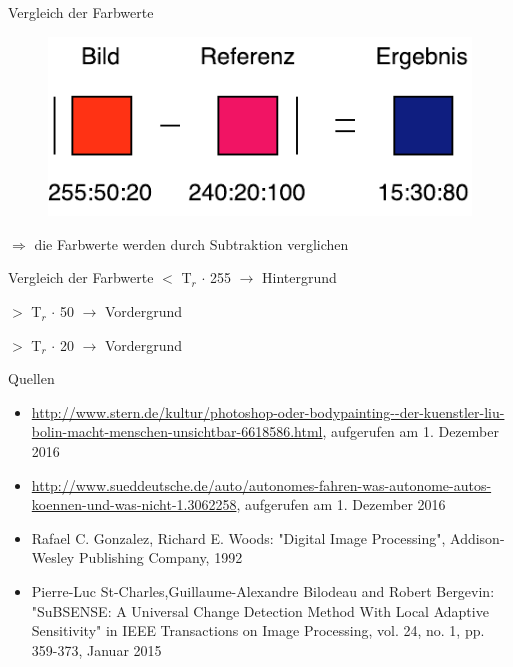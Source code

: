 \documentclass[hyperref={pdfpagelabels=false}]{beamer}
\begin{document}
\begin{frame}[t]{Vergleich der Farbwerte}
	\bigskip
	\bigskip
	\bigskip

	\begin{figure}
		\centering
		\includegraphics[width=0.6\linewidth]{Abbildungen/Farb_Vergleich.pdf}
		\label{fig:Abbildungen/Grid}
	\end{figure}
	\centering
	\bigskip
	$\Rightarrow$ die Farbwerte werden durch Subtraktion verglichen
\end{frame}

\begin{frame}[t]{Vergleich der Farbwerte}
	\centering
	 $<$ T$_r$ $\cdot$ 255 $\rightarrow$ Hintergrund

	 $>$ T$_r$ $\cdot$ 50 $\rightarrow$ Vordergrund
	
	 $>$ T$_r$ $\cdot$ 20 $\rightarrow$ Vordergrund

\end{frame}


\begin{frame}[t]{Quellen}
	\begin{itemize}
		\item \url{http://www.stern.de/kultur/photoshop-oder-bodypainting--der-kuenstler-liu-bolin-macht-menschen-unsichtbar-6618586.html}, aufgerufen am 1. Dezember 2016
		\item \url{http://www.sueddeutsche.de/auto/autonomes-fahren-was-autonome-autos-koennen-und-was-nicht-1.3062258}, aufgerufen am 1. Dezember 2016
		\item Rafael C. Gonzalez, Richard E. Woods: "Digital Image Processing", Addison-Wesley Publishing Company, 1992
		\item Pierre-Luc St-Charles,Guillaume-Alexandre Bilodeau and Robert Bergevin: "SuBSENSE: A Universal Change Detection Method With Local Adaptive Sensitivity" in IEEE Transactions on Image Processing, vol. 24, no. 1, pp. 359-373, Januar 2015
	\end{itemize}
\end{frame}
\end{document}
